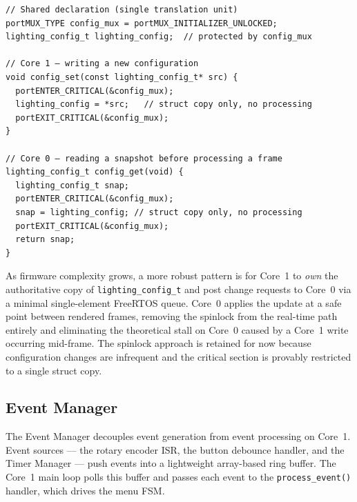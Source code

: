 \begin{longlisting}
\begin{verbatim}
// Shared declaration (single translation unit)
portMUX_TYPE config_mux = portMUX_INITIALIZER_UNLOCKED;
lighting_config_t lighting_config;	// protected by config_mux

// Core 1 — writing a new configuration
void config_set(const lighting_config_t* src) {
  portENTER_CRITICAL(&config_mux);
  lighting_config = *src;	// struct copy only, no processing
  portEXIT_CRITICAL(&config_mux);
}

// Core 0 — reading a snapshot before processing a frame
lighting_config_t config_get(void) {
  lighting_config_t snap;
  portENTER_CRITICAL(&config_mux);
  snap = lighting_config; // struct copy only, no processing
  portEXIT_CRITICAL(&config_mux);
  return snap;
}
\end{verbatim}
\caption{Dual-core safe access to \texttt{lighting\_config\_t} using \texttt{portMUX\_TYPE}.}
\label{lst:spinlock_config}
\end{longlisting}

\begin{tcolorbox}[colback=gray!8, colframe=gray!50, boxrule=0.4mm, arc=5px, title=\textbf{Planned Enhancement — Queue-Based Configuration Updates}]
As firmware complexity grows, a more robust pattern is for Core~1 to \emph{own} the authoritative copy of \texttt{lighting\_config\_t} and post change requests to Core~0 via a minimal single-element FreeRTOS queue.
Core~0 applies the update at a safe point between rendered frames, removing the spinlock from the real-time path entirely and eliminating the theoretical stall on Core~0 caused by a Core~1 write occurring mid-frame.
The spinlock approach is retained for now because configuration changes are infrequent and the critical section is provably restricted to a single struct copy.
\end{tcolorbox}

\subsection{Event Manager}
\label{sec:event_manager}

The Event Manager decouples event generation from event processing on Core~1.
Event sources — the rotary encoder \ac{ISR}, the button debounce handler, and the Timer Manager — push events into a lightweight array-based ring buffer.
The Core~1 main loop polls this buffer and passes each event to the \texttt{process\_event()} handler, which drives the menu \ac{FSM}.

